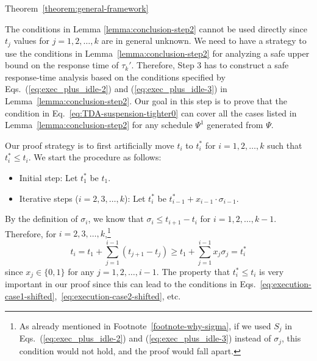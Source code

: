 \begin{appProof}{Theorem~\ref{theorem:general-framework}}






The conditions in Lemma \ref{lemma:conclusion-step2}  cannot be used directly since $t_j$ values for $j=1,2,\ldots,k$
are in general unknown. We need to have a strategy to use the
conditions in Lemma~\ref{lemma:conclusion-step2} for analyzing a safe upper bound on the response time of $\tau_k'$.
Therefore, Step 3 has to construct a safe response-time analysis based on the
conditions specified by Eqs.~(\ref{eq:exec_plus_idle-2}) and
(\ref{eq:exec_plus_idle-3}) in Lemma~\ref{lemma:conclusion-step2}. Our
goal in this step is to prove that the condition in
Eq.~\eqref{eq:TDA-suspension-tighter0} can cover all the cases listed
in Lemma~\ref{lemma:conclusion-step2} for any schedule $\Psi^1$ generated from $\Psi$.

Our proof strategy is to first artificially move $t_i$ to $t_i^*$ for $i=1,2,\ldots,k$ such that $t_i^*
\leq t_i$. We start
the procedure as follows:
\begin{itemize}
\item Initial step: Let $t_1^*$ be $t_1$.
\item Iterative steps ($i=2,3,\ldots,k$): Let $t_i^*$ be $t_{i-1}^*+x_{i-1}\cdot\sigma_{i-1}$.
\end{itemize}
By the definition of $\sigma_i$, we know that $\sigma_i \leq t_{i+1}-t_i$ for $i=1,2,\ldots,k-1$.
Therefore,  for $i=2,3,\ldots,k$,\footnote{As already mentioned in Footnote~\ref{footnote-why-sigma}, if we used $S_j$ in Eqs.~(\ref{eq:exec_plus_idle-2}) and
(\ref{eq:exec_plus_idle-3}) instead of $\sigma_j$, this condition would not hold, and the proof would fall apart.}
\begin{equation*}
  t_i = t_1 + \sum_{j=1}^{i-1} (t_{j+1} - t_j) \geq t_1 + \sum_{j=1}^{i-1} x_j \sigma_j = t_i^*
\end{equation*}
since $x_j \in \{0, 1\}$ for any $j=1,2,\ldots,i-1$. The property that $t_i^* \leq t_i$ is very important in our proof since this can lead to the conditions in Eqs.~\eqref{eq:execution-case1-shifted},~\eqref{eq:execution-case2-shifted}, etc.


\end{appProof}
